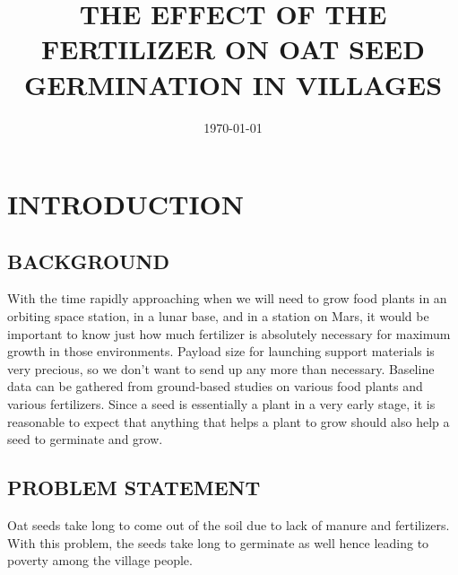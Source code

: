 \documentclass[11pt]{book}              %
\title{\bf THE EFFECT OF THE FERTILIZER ON OAT SEED GERMINATION IN VILLAGES}    %
\date{\today}                           %
\begin{document}
\frontmatter                            %
\maketitle                              %
                  

\section{INTRODUCTION}


\subsection{BACKGROUND}
With the time rapidly approaching when we will need to grow food plants in an orbiting space
station, in a lunar base, and in a station on Mars, it would be important to know just how much fertilizer is absolutely necessary
for maximum growth in those environments. Payload size for launching support materials is very precious, so we don't want to
send up any more than necessary. Baseline data can be gathered from ground-based studies on various food plants and various
fertilizers.
Since a seed is essentially a plant in a very early stage, it is reasonable to expect that anything that helps a plant to grow should also help a seed to germinate and grow.
\subsection{ PROBLEM STATEMENT}
 Oat seeds take long to come out of the soil due to lack of manure and fertilizers. With this problem, the seeds take long to germinate as well hence leading to poverty among the village people.
\end{document}
